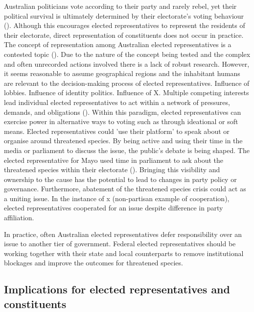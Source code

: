 \documentclass[a4paper,11pt]{article}
\begin{document}
Australian politicians vote according to their party and rarely rebel, yet their political survival is ultimately determined by their electorate's voting behaviour (\cite{brentonWhatLiesWork2010}). Although this encourages elected representatives to represent the residents of their electorate, direct representation of constituents does not occur in practice. The concept of representation among Australian elected representatives is a contested topic (\cite{brentonWhatLiesWork2010}). Due to the nature of the concept being tested and the complex and often unrecorded actions involved there is a lack of robust research. However, it seems reasonable to assume geographical regions and the inhabitant humans are relevant to the decision-making process of elected representatives. Influence of lobbies. Influence of identity politics. Influence of X. Multiple competing interests lead individual elected representatives to act within a network of pressures, demands, and obligations (\cite{brentonWhatLiesWork2010}). Within this paradigm, elected representatives can exercise power in alternative ways to voting such as through ideational or soft means. Elected representatives could 'use their platform' to speak about or organise around threatened species. By being active and using their time in the media or parliament to discuss the issue, the public's debate is being shaped. The elected representative for Mayo used time in parliament to ask about the threatened species within their electorate (\cite{househansardQUESTIONSWRITINGMayo2019}). Bringing this visibility and ownership to the cause has the potential to lead to changes in party policy or governance. Furthermore, abatement of the threatened species crisis could act as a uniting issue. In the instance of x (non-partisan example of cooperation), elected representatives cooperated for an issue despite difference in party affiliation.

In practice, often Australian elected representatives defer responsibility over an issue to another tier of government. Federal elected representatives should be working together with their state and local counterparts to remove institutional blockages and improve the outcomes for threatened species.

\subsection{Implications for elected representatives and constituents}
\end{document}

